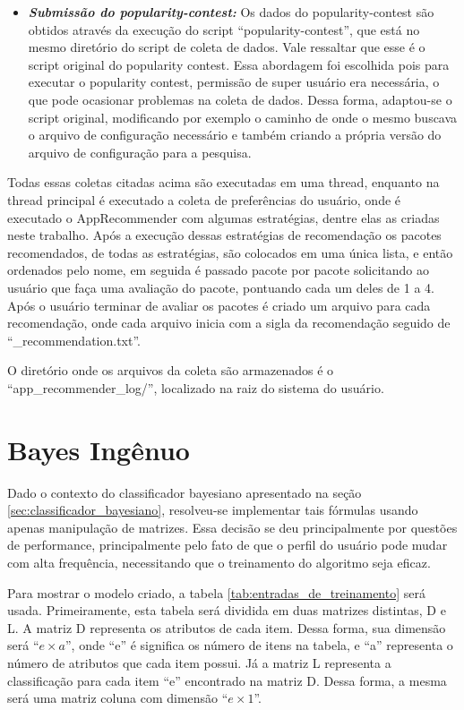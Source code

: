 \begin{anexosenv}
\begin{itemize}
  \item \textit{\textbf{Submissão do popularity-contest:}} Os dados do
  popularity-contest são obtidos através da execução do script ``popularity-contest'',
  que está no mesmo diretório do script de coleta de dados. Vale ressaltar que
  esse é o script original do popularity contest. Essa abordagem foi escolhida
  pois para executar o popularity contest, permissão de super usuário era
  necessária, o que pode ocasionar problemas na coleta de dados. Dessa forma,
  adaptou-se o script original, modificando por exemplo o caminho de onde o
  mesmo buscava o arquivo de configuração necessário e também criando a própria
  versão do arquivo de configuração para a pesquisa.
\end{itemize}

Todas essas coletas citadas acima são executadas em uma thread, enquanto
na thread principal é executado a coleta de preferências do usuário, onde
é executado o AppRecommender com algumas estratégias, dentre elas as criadas
neste trabalho. Após a execução dessas estratégias de recomendação os
pacotes recomendados, de todas as estratégias, são colocados em uma única
lista, e então ordenados pelo nome, em seguida é passado pacote por pacote
solicitando ao usuário que faça uma avaliação do pacote, pontuando cada um
deles de 1 a 4. Após o usuário terminar de avaliar os pacotes é criado um
arquivo para cada recomendação, onde cada arquivo inicia com a sigla da
recomendação seguido de ``\_recommendation.txt''.

O diretório onde os arquivos da coleta são armazenados é o ``app\_recommender\_log/'',
localizado na raiz do sistema do usuário.


\chapter{Bayes Ingênuo} \label{sec:bayes_ingenuo}

Dado o contexto do classificador bayesiano apresentado na seção
\ref{sec:classificador_bayesiano}, resolveu-se implementar tais fórmulas usando
apenas manipulação de matrizes. Essa decisão se deu principalmente por questões
de performance, principalmente pelo fato de que o perfil do usuário pode mudar
com alta frequência, necessitando que o treinamento do algoritmo seja eficaz.

Para mostrar o modelo criado, a tabela \ref{tab:entradas_de_treinamento} será
usada. Primeiramente, esta tabela será dividida em duas matrizes distintas, D e
L. A matriz D representa os atributos de cada item. Dessa forma, sua dimensão
será ``${e \times a}$'', onde ``e'' é significa os número de itens na tabela, e
``a'' representa o número de atributos que cada item possui. Já a matriz L
representa a classificação para cada item ``e'' encontrado na matriz D. Dessa
forma, a mesma será uma matriz coluna com dimensão ``${e \times 1}$''.


\end{anexosenv}
